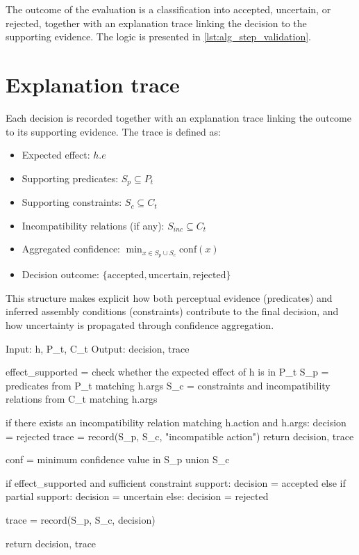 \documentclass[11pt,titlepage,openright]{book}
\renewenvironment{listing*}[1][]{%
  \begin{listing}[#1]%
    }{%
  \end{listing}}
\begin{document}
The outcome of the evaluation is a classification into accepted, uncertain, or rejected, together with an explanation trace linking the decision to the supporting evidence. The logic is presented in \cref{lst:alg_step_validation}.

\section{Explanation trace}

Each decision is recorded together with an explanation trace linking the outcome to its supporting evidence. The trace is defined as:

\begin{itemize}
\item Expected effect: $h.e$
\item Supporting predicates: $S_p \subseteq P_t$
\item Supporting constraints: $S_c \subseteq C_t$
\item Incompatibility relations (if any): $S_{inc} \subseteq C_t$
\item Aggregated confidence: $\min_{x \in S_p \cup S_c} \text{conf}(x)$
\item Decision outcome: $\{\text{accepted}, \text{uncertain}, \text{rejected}\}$
\end{itemize}

This structure makes explicit how both perceptual evidence (predicates) and inferred assembly conditions (constraints) contribute to the final decision, and how uncertainty is propagated through confidence aggregation.

\begin{listing*}
\begin{Code}
Input: h, P_t, C_t
Output: decision, trace

effect_supported = check whether the expected effect of h is in P_t
S_p = predicates from P_t matching h.args
S_c = constraints and incompatibility relations from C_t matching h.args

if there exists an incompatibility relation matching h.action and h.args:
    decision = rejected
    trace = record(S_p, S_c, "incompatible action")
    return decision, trace

conf = minimum confidence value in S_p union S_c

if effect_supported and sufficient constraint support:
    decision = accepted
else if partial support:
    decision = uncertain
else:
    decision = rejected

trace = record(S_p, S_c, decision)

return decision, trace
\end{Code}
\caption{Algorithm for Step validation with compatibility enforcement and explanation trace generation (local reasoning as described in \cref{sub:layer4-method-design-decisions}).}
\label{lst:alg_step_validation}
\end{listing*}
\end{document}
